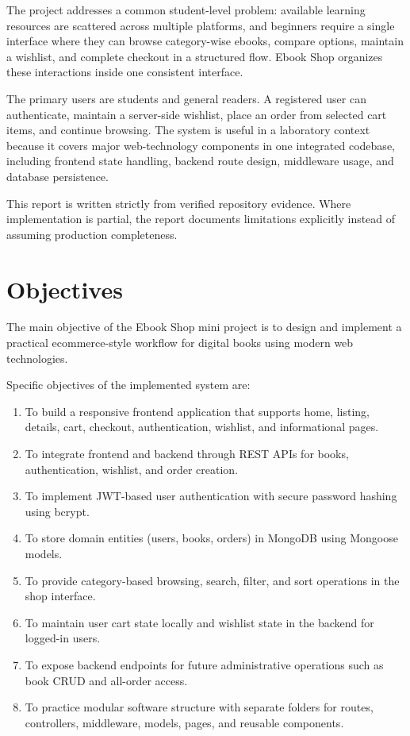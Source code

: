 \documentclass[12pt,a4paper]{report}
\begin{document}
The project addresses a common student-level problem: available learning resources are scattered across multiple platforms, and beginners require a single interface where they can browse category-wise ebooks, compare options, maintain a wishlist, and complete checkout in a structured flow. Ebook Shop organizes these interactions inside one consistent interface.

The primary users are students and general readers. A registered user can authenticate, maintain a server-side wishlist, place an order from selected cart items, and continue browsing. The system is useful in a laboratory context because it covers major web-technology components in one integrated codebase, including frontend state handling, backend route design, middleware usage, and database persistence.

This report is written strictly from verified repository evidence. Where implementation is partial, the report documents limitations explicitly instead of assuming production completeness.

\chapter{Objectives}
The main objective of the Ebook Shop mini project is to design and implement a practical ecommerce-style workflow for digital books using modern web technologies.

\vspace{0.3cm}
\noindent Specific objectives of the implemented system are:
\begin{enumerate}[label=\arabic*.]
    \item To build a responsive frontend application that supports home, listing, details, cart, checkout, authentication, wishlist, and informational pages.
    \item To integrate frontend and backend through REST APIs for books, authentication, wishlist, and order creation.
    \item To implement JWT-based user authentication with secure password hashing using bcrypt.
    \item To store domain entities (users, books, orders) in MongoDB using Mongoose models.
    \item To provide category-based browsing, search, filter, and sort operations in the shop interface.
    \item To maintain user cart state locally and wishlist state in the backend for logged-in users.
    \item To expose backend endpoints for future administrative operations such as book CRUD and all-order access.
    \item To practice modular software structure with separate folders for routes, controllers, middleware, models, pages, and reusable components.
\end{enumerate}
\end{document}
